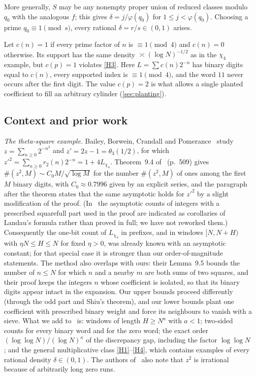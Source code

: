 \documentclass[11pt]{article}
\begin{document}
More generally, $S$ may be any nonempty proper union of reduced classes modulo
$q_0$ with the analogous $f$; this gives $\delta=j/\varphi(q_0)$ for
$1\le j<\varphi(q_0)$. Choosing a prime $q_0\equiv1\pmod s$, every rational
$\delta=r/s\in(0,1)$ arises.

\begin{remark}\label{rem:local}
Let $c(n)=1$ if every prime factor of $n$ is $\equiv1\pmod4$ and $c(n)=0$
otherwise. Its support has the same density $\asymp(\log N)^{-1/2}$ as in the
$\chi_4$ example, but $c(p)=1$ violates \ref{H3}. Here $L=\sum c(n)2^{-n}$ has
binary digits equal to $c(n)$, every supported index is $\equiv1\pmod 4$, and the
word $11$ never occurs after the first digit. The value $c(p)=2$ is what allows a
single planted coefficient to fill an arbitrary cylinder (\cref{sec:planting}).
\end{remark}

\subsection{Context and prior work}\label{subsec:context}

\emph{The theta-square example.} Bailey, Borwein, Crandall and
Pomerance~\cite[\S9]{BBCP2004} study $z=\sum_{n\ge0}2^{-n^2}$ and
$z'=2z-1=\theta_3(1/2)$, for which $z'^2=\sum_{n\ge0}r_2(n)2^{-n}=1+4L_{\chi_4}$.
Theorem~9.4 of~\cite{BBCP2004} (p.~509) gives $\#(z^2,M)\sim C_0M/\sqrt{\log M}$
for the number $\#(z^2,M)$ of ones among the first $M$ binary digits, with
$C_0\approx0.7996$ given by an explicit series, and the paragraph after the
theorem states that the same asymptotic holds for $z'^2$ by a slight
modification of the proof. (In~\cite{BBCP2004} the asymptotic counts of
integers with a prescribed squarefull part used in the proof are indicated as
corollaries of Landau's formula rather than proved in full; we have not
reworked them.) Consequently the one-bit count of $L_{\chi_4}$ in prefixes, and
in windows $[N,N+H)$ with $\eta N\le H\le N$ for fixed $\eta>0$, was already
known with an asymptotic constant; for that special case it is stronger than
our order-of-magnitude statements. The method also overlaps with ours: their
Lemma~9.5 bounds the number of $n\le N$ for which $n$ and a nearby $m$ are both
sums of two squares, and their proof keeps the integers $n$ whose coefficient
is isolated, so that its binary digits appear intact in the expansion. Our
upper bounds proceed differently (through the odd part and Shiu's theorem),
and our lower bounds plant one coefficient with prescribed binary weight and
force its neighbours to vanish with a sieve. What we add to~\cite{BBCP2004} is:
windows of length $H\ge N^a$ with $a<1$; two-sided counts for every binary word
and for the zero word; the exact order $(\log\log N)/(\log N)^\kappa$ of the
discrepancy gap, including the factor $\log\log N$; and the general
multiplicative class \ref{H1}--\ref{H4}, which contains examples of every
rational density $\delta\in(0,1)$. The authors of~\cite{BBCP2004} also note
that $z^2$ is irrational because of arbitrarily long zero runs.
\end{document}
